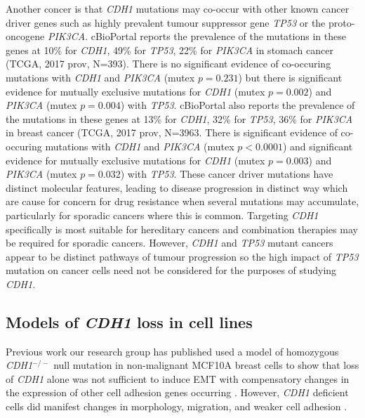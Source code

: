 Another concer is that \textit{CDH1} mutations may co-occur with other known cancer driver genes such as highly prevalent tumour suppressor gene \textit{\textit{TP53}} or the proto-oncogene \textit{\textit{PIK3CA}}. cBioPortal reports the prevalence of the mutations in these genes at 10\% for \textit{CDH1}, 49\% for \textit{\textit{TP53}}, 22\% for \textit{\textit{PIK3CA}} in stomach cancer (TCGA, 2017 prov, N=393). There is no significant evidence of co-occuring mutations with \textit{CDH1} and \textit{\textit{PIK3CA}} (mutex $p=0.231$) but there is significant evidence for mutually exclusive mutations for \textit{CDH1} (mutex $p=0.002$) and \textit{\textit{PIK3CA}} (mutex $p=0.004$) with \textit{\textit{TP53}}. cBioPortal also reports the prevalence of the mutations in these genes at 13\% for \textit{CDH1}, 32\% for \textit{\textit{TP53}}, 36\% for \textit{\textit{PIK3CA}} in breast cancer (TCGA, 2017 prov, N=3963. There is significant evidence of co-occuring mutations with \textit{CDH1} and \textit{\textit{PIK3CA}} (mutex $p<0.0001$) and significant evidence for mutually exclusive mutations for \textit{CDH1} (mutex $p=0.003$) and \textit{\textit{PIK3CA}} (mutex $p=0.032$) with \textit{\textit{TP53}}. These cancer driver mutations have distinct molecular features, leading to disease progression in distinct way which are cause for concern for drug resistance when several mutations may accumulate, particularly for sporadic cancers where this is common. Targeting \textit{CDH1} specifically is most suitable for hereditary cancers and combination therapies may be required for sporadic cancers. However, \textit{CDH1} and \textit{\textit{TP53}} mutant cancers appear to be distinct pathways of tumour progression so the high impact of \textit{\textit{TP53}} mutation on cancer cells need not be considered for the purposes of studying \textit{CDH1}.

\subsection{Models of \textit{CDH1} loss in cell lines}
Previous work our research group has published used a model of  homozygous \textit{CDH1}$^{-/-}$ null mutation in non-malignant MCF10A breast cells to show that loss of \textit{CDH1} alone was not sufficient to induce EMT with compensatory changes in the expression of other cell adhesion genes occurring \cite{Chen2014}. However, \textit{CDH1} deficient cells did manifest changes in morphology, migration, and weaker cell adhesion \cite{Chen2014}.

